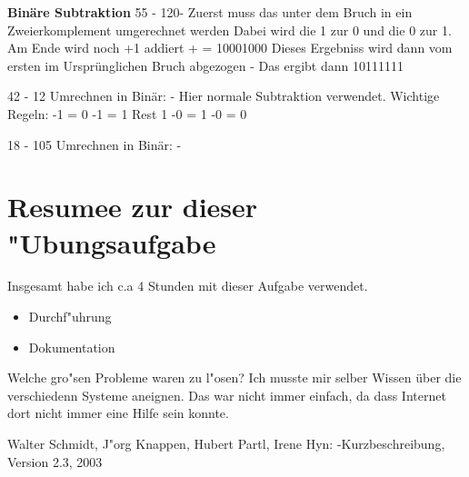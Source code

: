 \documentclass[a4paper,11pt,titlepage]{article}
\begin{document}
\textbf{Bin\"are Subtraktion}
55 - 120- \newline
Zuerst muss das unter dem Bruch in ein Zweierkomplement umgerechnet werden \newline
Dabei wird die 1 zur 0 und die 0 zur 1. Am Ende wird noch +1 addiert + \newline
= 10001000 \newline
Dieses Ergebniss wird dann vom ersten im Urspr\"unglichen Bruch abgezogen - \newline
Das ergibt dann 10111111 \newline



42 - 12 \newline
Umrechnen in Binär: -  \newline
Hier normale Subtraktion verwendet. \newline
Wichtige Regeln: -1 = 0 -1 = 1 Rest 1 -0 = 1 -0 = 0 \newline

18 - 105 \newline
Umrechnen in Binär:  -  \newline


\section{Resumee zur dieser "Ubungsaufgabe}
Insgesamt habe ich c.a 4 Stunden mit dieser Aufgabe verwendet.
\begin{itemize}
	\item Durchf"uhrung
	\item Dokumentation
\end{itemize}
Welche gro"sen Probleme waren zu l"osen?
Ich musste mir selber Wissen \"uber die verschiedenn Systeme aneignen. Das war nicht immer einfach, da dass Internet dort nicht immer eine Hilfe sein konnte.

\begin{thebibliography}{99}
	Walter Schmidt, J"org Knappen, Hubert Partl, Irene Hyn: 
\LaTeXe-Kurzbeschreibung, 	Version 2.3, 2003
	

\end{thebibliography}
\end{document}

